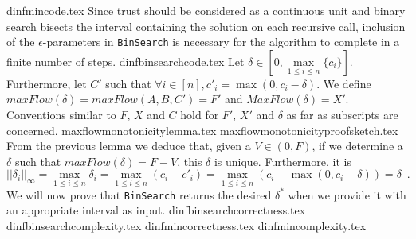   {dinfmincode.tex}
  Since trust should be considered as a continuous unit and binary search bisects the interval containing the solution
  on each recursive call, inclusion of the $\epsilon$-parameters in \texttt{BinSearch} is necessary for the algorithm to
  complete in a finite number of steps.
  {dinfbinsearchcode.tex}
  Let $\delta \in \left[0, \max\limits_{1 \leq i \leq n}{\{c_i\}}\right]$. Furthermore, let $C'$ such that
  $\forall i \in \left[n\right], c'_i = \max{\left(0, c_i - \delta\right)}$. We define $maxFlow\left(\delta\right) = 
  maxFlow\left(A, B, C'\right) = F'$ and $MaxFlow\left(\delta\right) = X'$. Conventions similar to $F$, $X$ and $C$ hold
  for $F'$, $X'$ and $\delta$ as far as subscripts are concerned.
  {maxflowmonotonicitylemma.tex}
  {maxflowmonotonicityproofsketch.tex}
  From the previous lemma we deduce that, given a $V \in \left(0, F\right)$, if we determine a $\delta$ such that
  $maxFlow\left(\delta\right) = F - V$, this $\delta$ is unique. Furthermore, it is
  \begin{equation*}
    ||\delta_i||_\infty = \max\limits_{1 \leq i \leq n}{\delta_i} = \max\limits_{1 \leq i \leq n}{\left(c_i - c'_i\right)} =
    \max\limits_{1 \leq i \leq n}{\left(c_i - \max{\left(0, c_i - \delta\right)}\right)} = \delta \enspace.
  \end{equation*}
  We will now prove that \texttt{BinSearch} returns the desired $\delta^*$ when we provide it with an appropriate interval
  as input.
  {dinfbinsearchcorrectness.tex}
  {dinfbinsearchcomplexity.tex}
  {dinfmincorrectness.tex}
  {dinfmincomplexity.tex}

